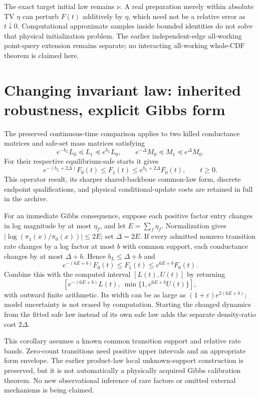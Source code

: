 \documentclass[11pt]{article}
\newcommand{\eps}{\varepsilon}
\begin{document}
The exact target initial law remains $\nu$. A real preparation merely within absolute TV $\eta$ can perturb $F(t)$ additively by $\eta$, which need not be a relative error as $t\downarrow0$. Computational approximate samples inside bounded identities do not solve that physical initialization problem. The earlier independent-edge all-working point-query extension remains separate; no interacting all-working whole-CDF theorem is claimed here.

\section{Changing invariant law: inherited robustness, explicit Gibbs form}
The preserved continuous-time comparison applies to two killed conductance matrices and safe-set mass matrices satisfying
\[
 e^{-b_L}L_0\preceq L_1\preceq e^{b_L}L_0,
 \qquad e^{-\Delta}M_0\preceq M_1\preceq e^\Delta M_0.
\]
For their respective equilibrium-safe starts it gives
\begin{equation}
 e^{-(b_L+2\Delta)}F_0(t)\le F_1(t)
 \le e^{b_L+2\Delta}F_0(t),\qquad t\ge0.
 \label{eq:uncert}
\end{equation}
This operator result, its sharper shared-backbone common-law form, discrete endpoint qualifications, and physical conditional-update costs are retained in full in the archive.

For an immediate Gibbs consequence, suppose each positive factor entry changes in log magnitude by at most $\eta_f$, and let $E=\sum_f\eta_f$. Normalization gives $|\log(\pi_1(x)/\pi_0(x))|\le2E$; set $\Delta=2E$. If every admitted nonzero transition rate changes by a log factor at most $b$ with common support, each conductance changes by at most $\Delta+b$. Hence $b_L\le\Delta+b$ and
\[
 e^{-(6E+b)}F_0(t)\le F_1(t)\le e^{6E+b}F_0(t).
\]
Combine this with the computed interval $[L(t),U(t)]$ by returning
\[
 [e^{-(6E+b)}L(t),\ \min\{1,e^{6E+b}U(t)\}],
\]
with outward finite arithmetic. Its width can be as large as $(1+\eps)e^{2(6E+b)}$; model uncertainty is not erased by computation. Starting the changed dynamics from the fitted safe law instead of its own safe law adds the separate density-ratio cost $2\Delta$.

This corollary assumes a known common transition support and relative rate bands. Zero-count transitions need positive upper intervals and an appropriate form envelope. The earlier product-law local unknown-support construction is preserved, but it is not automatically a physically acquired Gibbs calibration theorem. No new observational inference of rare factors or omitted external mechanisms is being claimed.
\end{document}
